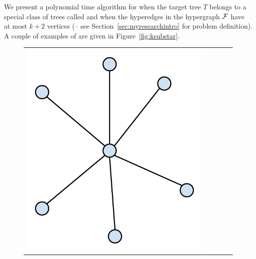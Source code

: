 We present a polynomial time algorithm for {\CFTPL} when the target
tree $T$ belongs to a special class of trees called {\em \kstars} and
when the hyperedges in the hypergraph ${\cal F}$ have at most $k+2$
vertices (\CFTPLKTREE -- see Section~\ref{sec:myresearchintro} for
problem definition). A couple of examples of {\kstars} are given in
Figure~\ref{fig:ksubstar}.


\begin{figure}[t]
  \centering
  \begin{tabular}[h]{ccccc}
    \includegraphics[scale=0.3]{../img/star.pdf} &&&&

\end{tabular}
\end{figure}
